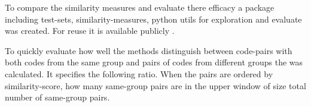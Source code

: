 \documentclass[../main.tex]{subfiles}
\begin{document}
To compare the similarity measures and evaluate there efficacy a package including test-sets,
similarity-measures, python utils for exploration and evaluate was created. For reuse it is available publicly \cite{ethereum-contract-similarity}.

To quickly evaluate how well the methods distinguish between code-pairs with both codes from the same group and pairs of codes from different groups the  was calculated.
It specifies the following ratio.
When the pairs are ordered by similarity-score, how many same-group pairs are in the upper window of size total number of same-group pairs.
\end{document}
